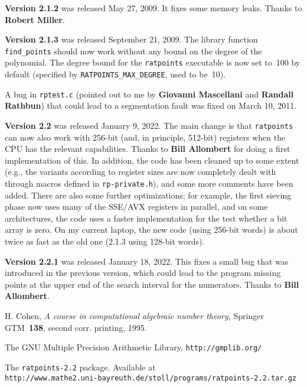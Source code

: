 \documentclass[12pt,a4paper,oneside]{amsart}
\newcommand{\rpversion}{2.2} %
\begin{document}
\textbf{Version 2.1.2} was released May 27, 2009. It fixes some memory leaks.
Thanks to \textbf{Robert Miller}.

\textbf{Version 2.1.3} was released September 21, 2009. The library function
\verb+find_points+ should now work without any bound on the degree of the
polynomial. The degree bound for the \texttt{ratpoints} executable is now set
to~100 by default (specified by \verb+RATPOINTS_MAX_DEGREE+, used to be~10).

A bug in \texttt{rptest.c} (pointed out to me by \textbf{Giovanni Mascellani}
and \textbf{Randall Rathbun}) that could lead to a segmentation fault was fixed on
March 10, 2011.

\textbf{Version 2.2} was released January 9, 2022. The main change is that
\texttt{ratpoints} can now also work with 256-bit (and, in principle, 512-bit)
registers when the CPU has the relevant capabilities. Thanks to
\textbf{Bill Allombert} for doing a first implementation of this. In addition,
the code has been cleaned up to some extent (e.g., the variants according
to register sizes are now completely dealt with through macros defined
in \texttt{rp-private.h}), and some more comments have been added.
There are also some further optimizations; for example, the first sieving
phase now uses many of the SSE/AVX registers in parallel, and on some
architectures, the code uses a faster implementation for the test whether
a bit array is zero. On my current laptop, the new code (using 256-bit words)
is about twice as fast as the old one (2.1.3 using 128-bit words).

\textbf{Version 2.2.1} was released January 18, 2022. This fixes a small
bug that was introduced in the previous version, which could lead to
the program missing points at the upper end of the search interval
for the numerators. Thanks to \textbf{Bill Allombert}.


\begin{thebibliography}{gmp}
\frenchspacing

  H. Cohen, \textit{A course in computational algebraic number theory,}
  Springer GTM~\textbf{138}, second corr. printing, 1995.

  The GNU Multiple Precision Arithmetic Library, \texttt{http://gmplib.org/}

  The \texttt{ratpoints-\rpversion} package. Available at \\
  \texttt{http://www.mathe2.uni-bayreuth.de/stoll/programs/ratpoints-\rpversion.tar.gz}

\end{thebibliography}
\end{document}
